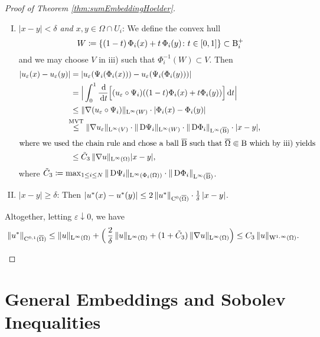 \begin{proof}[Proof of Theorem \ref{thm:sumEmbeddingHoelder}]
\begin{enumerate}[i)]
\begin{enumerate}[I)]
        \item \emph{$|x - y| < \delta$ and $x,y \in \Omega \cap U_i$}:
          We define the convex hull $$W \coloneqq \{ (1 - t)\, \Phi_i(x) + t \,\Phi_i(y) \colon t \in [0,1]\} \subset \mathrm{B}_i^+$$ and we may choose $V$ in iii) such that $\Phi_i^{-1}(W) \subset V$.
          Then
          \begin{align*}
            |u_\varepsilon(x) - u_\varepsilon(y)|
            &= |u_\varepsilon(\Psi_i(\Phi_i(x))) - u_\varepsilon(\Psi_i(\Phi_i(y)))| \\
            &= \Big| \int_0^1 \frac{\, {\operatorname{d}\!{}} }{\, {\operatorname{d}\!{t}}} \Big[ (u_\varepsilon \circ \Psi_i)((1 - t)\Phi_i(x) + t\Phi_i(y)) \Big] \, {\operatorname{d}\!{t}} \Big| \\
            &\leq \| \nabla(u_\varepsilon \circ \Psi_i)\|_{\mathrm{L}^\infty(W)} \cdot |\Phi_i(x) - \Phi_i(y)| \\
            &\hspace{-0.5em}\overset{\text{MVT}}{\leq} \| \nabla u_\varepsilon \|_{\mathrm{L}^\infty(V)} \cdot \|\,{\operatorname{D}} \Psi_i\|_{\mathrm{L}^\infty(W)} \cdot \|\,{\operatorname{D}} \Phi_i\|_{\mathrm{L}^\infty(\overline {\mathrm{B}})} \cdot |x - y|, \\
            \intertext{where we used the chain rule and chose a ball $\overline{\mathrm{B}}$ such that $\overline \Omega \Subset \mathrm{B}$ which by iii) yields}
            &\leq \tilde C_3 \, \|\nabla u\|_{\mathrm{L}^\infty(\Omega)} | x - y |,
          \end{align*}
          where $\tilde C_3 \coloneqq \max_{1\leq i \leq N} \|\,{\operatorname{D}} \Psi_i \|_{\mathrm{L}^\infty(\Phi_i(\Omega))} \cdot \| \,{\operatorname{D}} \Phi_i \|_{\mathrm{L}^\infty(\overline {\mathrm{B}})}$.

        \item $|x - y| \geq \delta$:
          Then 
          $|u^*(x) - u^*(y)| \leq 2 \, \|u^*\|_{\mathrm{C}^0(\overline\Omega)} \cdot \frac{1}{\delta}\, |x - y|$.
      \end{enumerate}
      Altogether, letting $\varepsilon \downarrow 0$, we have 
      \[
      \|u^*\|_{\mathrm{C}^{0,1}(\overline\Omega)} 
      \leq \|u\|_{\mathrm{L}^\infty(\Omega)} + \Big( \, \frac{2}{\delta}\, \|u\|_{\mathrm{L}^\infty(\Omega)} + (1 + \tilde C_3 )\, \|\nabla u\|_{\mathrm{L}^\infty(\Omega)} \Big) 
      \leq C_3 \, \|u\|_{\mathrm{W}^{1,\infty}(\Omega)}.\qedhere
      \]
  \end{enumerate}
\end{proof}

\section{General Embeddings and Sobolev Inequalities}

